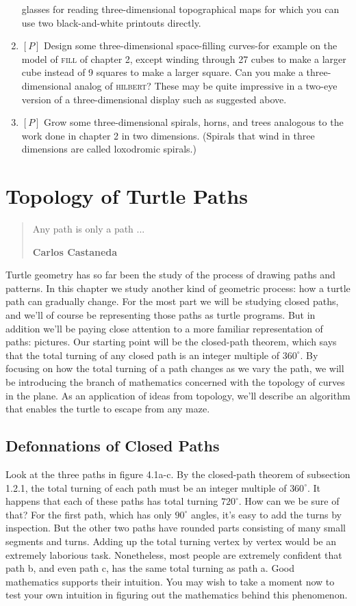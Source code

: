 \documentclass{book}
\begin{document}
\begin{enumerate}
glasses for reading three-dimensional topographical maps for which you
can use two black-and-white printouts directly.
\item $[P]$ Design some three-dimensional space-filling curves-for example 
on the model of \textsc{fill} of chapter 2, except winding through 27 cubes to
make a larger cube instead of 9 squares to make a larger square. Can
you make a three-dimensional analog of \textsc{hilbert}? These may be quite
impressive in a two-eye version of a three-dimensional display such as
suggested above.
\item $[P]$ Grow some three-dimensional spirals, horns, and trees analogous
to the work done in chapter 2 in two dimensions. (Spirals that wind in
three dimensions are called loxodromic spirals.)
\end{enumerate}

\chapter{Topology of Turtle Paths}
\begin{quote}
Any path is only a path ...

\textbf{Carlos Castaneda}
\end{quote}

Turtle geometry has so far been the study of the process of drawing
paths and patterns. In this chapter we study another kind of geometric
process: how a turtle path can gradually change. For the most part we
will be studying closed paths, and we'll of course be representing those
paths as turtle programs. But in addition we'll be paying close attention
to a more familiar representation of paths: pictures. Our starting point
will be the closed-path theorem, which says that the total turning of any
closed path is an integer multiple of $360^{\circ}$. By focusing on how the total
turning of a path changes as we vary the path, we will be introducing
the branch of mathematics concerned with the topology of curves in
the plane. As an application of ideas from topology, we'll describe an
algorithm that enables the turtle to escape from any maze.

\section{Defonnations of Closed Paths}

Look at the three paths in figure 4.1a-c. By the closed-path theorem
of subsection 1.2.1, the total turning of each path must be an integer
multiple of $360^{\circ}$. It happens that each of these paths has total turning
$720^{\circ}$. How can we be sure of that? For the first path, which has only
$90^{\circ}$ angles, it's easy to add the turns by inspection. But the other two
paths have rounded parts consisting of many small segments and turns.
Adding up the total turning vertex by vertex would be an extremely
laborious task. Nonetheless, most people are extremely confident that
path b, and even path c, has the same total turning as path a. Good
mathematics supports their intuition. You may wish to take a moment
now to test your own intuition in figuring out the mathematics behind
this phenomenon.
\end{document}
